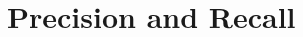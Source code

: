 \documentclass[a4paper,english,12pt]{article}
\begin{document}
\begin{spacing}{1.0}
\begin{itemize}
\end{itemize}


\section{Precision and Recall}


\end{spacing}
\end{document}

